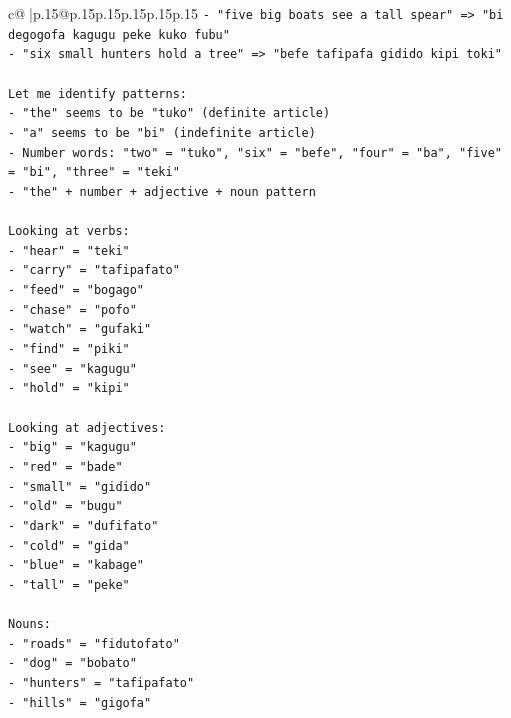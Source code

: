 \documentclass{article}
\begin{document}
{\begin{supertabular}{c@{$\;$}|p{.15\linewidth}@{}p{.15\linewidth}p{.15\linewidth}p{.15\linewidth}p{.15\linewidth}p{.15\linewidth}}
{{{\texttt{{-} "five big boats see a tall spear" => "bi degogofa kagugu peke kuko fubu"} \\
\texttt{{-} "six small hunters hold a tree" => "befe tafipafa gidido kipi toki"} \\
\\ 
\texttt{Let me identify patterns:} \\
\texttt{{-} "the" seems to be "tuko" (definite article)} \\
\texttt{{-} "a" seems to be "bi" (indefinite article)} \\
\texttt{{-} Number words: "two" = "tuko", "six" = "befe", "four" = "ba", "five" = "bi", "three" = "teki"} \\
\texttt{{-} "the" + number + adjective + noun pattern} \\
\\ 
\texttt{Looking at verbs:} \\
\texttt{{-} "hear" = "teki"} \\
\texttt{{-} "carry" = "tafipafato"} \\
\texttt{{-} "feed" = "bogago"} \\
\texttt{{-} "chase" = "pofo"} \\
\texttt{{-} "watch" = "gufaki"} \\
\texttt{{-} "find" = "piki"} \\
\texttt{{-} "see" = "kagugu"} \\
\texttt{{-} "hold" = "kipi"} \\
\\ 
\texttt{Looking at adjectives:} \\
\texttt{{-} "big" = "kagugu"} \\
\texttt{{-} "red" = "bade"} \\
\texttt{{-} "small" = "gidido"} \\
\texttt{{-} "old" = "bugu"} \\
\texttt{{-} "dark" = "dufifato"} \\
\texttt{{-} "cold" = "gida"} \\
\texttt{{-} "blue" = "kabage"} \\
\texttt{{-} "tall" = "peke"} \\
\\ 
\texttt{Nouns:} \\
\texttt{{-} "roads" = "fidutofato"} \\
\texttt{{-} "dog" = "bobato"} \\
\texttt{{-} "hunters" = "tafipafato"} \\
\texttt{{-} "hills" = "gigofa"} \\
}}}
\end{supertabular}}
\end{document}

